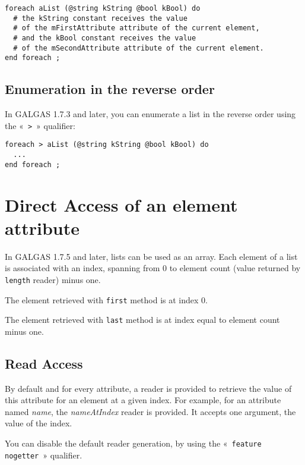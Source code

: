 \begin{lstlisting}[language=galgas]
foreach aList (@string kString @bool kBool) do
  # the kString constant receives the value
  # of the mFirstAttribute attribute of the current element,
  # and the kBool constant receives the value
  # of the mSecondAttribute attribute of the current element.
end foreach ;
\end{lstlisting}

\subsection{Enumeration in the reverse order}

In GALGAS 1.7.3 and later, you can enumerate a list in the reverse order using the «~\lstinline[language=galgas]!>!~» qualifier:

\begin{lstlisting}[language=galgas]
foreach > aList (@string kString @bool kBool) do
  ...
end foreach ;
\end{lstlisting}




\section{Direct Access of an element attribute}

In GALGAS 1.7.5 and later, lists can be used as an array. Each element of a list is associated with an  index, spanning from 0 to element count (value returned by \lstinline[language=galgas]!length! reader) minus one.

The element retrieved with \lstinline[language=galgas]!first! method is at index 0.

The element retrieved with \lstinline[language=galgas]!last! method is at index equal to element count minus one.

\subsection{Read Access}

By default and for every attribute, a reader is provided to retrieve the value of this attribute for an element at a given index. For example, for an attribute named \emph{name}, the \emph{nameAtIndex} reader is provided. It accepts one  argument, the value of the index.

You can disable the default reader generation, by using the «~\lstinline[language=galgas]!feature nogetter!~» qualifier.

